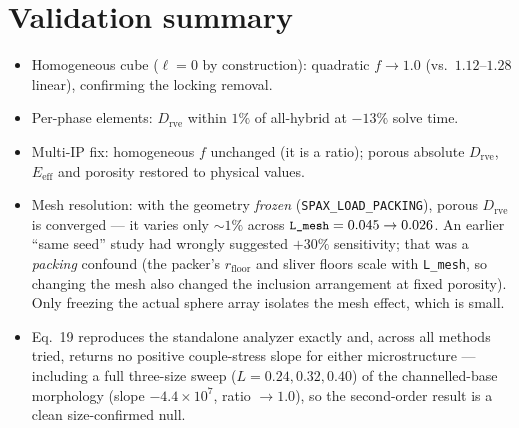 \documentclass[11pt]{article}
\newcommand{\code}[1]{\texttt{\small #1}}
\newcommand{\env}[1]{\texttt{\small #1}}
\begin{document}
\section{Validation summary}
\begin{itemize}[nosep]
  \item Homogeneous cube ($\ell\!=\!0$ by construction): quadratic $f\!\to\!1.0$
        (vs.\ $1.12$--$1.28$ linear), confirming the locking removal.
  \item Per-phase elements: $D_\text{rve}$ within $1\%$ of all-hybrid at
        $-13\%$ solve time.
  \item Multi-IP fix: homogeneous $f$ unchanged (it is a ratio); porous absolute
        $D_\text{rve}$, $E_\text{eff}$ and porosity restored to physical values.
  \item Mesh resolution: with the geometry \emph{frozen}
        (\env{SPAX\_LOAD\_PACKING}), porous $D_\text{rve}$ is converged --- it
        varies only $\sim\!1\%$ across $\code{L\_mesh}=0.045\to0.026$. An earlier
        ``same seed'' study had wrongly suggested $+30\%$ sensitivity; that was a
        \emph{packing} confound (the packer's $r_\text{floor}$ and sliver floors
        scale with \code{L\_mesh}, so changing the mesh also changed the
        inclusion arrangement at fixed porosity). Only freezing the actual sphere
        array isolates the mesh effect, which is small.
  \item Eq.~19 reproduces the standalone analyzer exactly and, across all
        methods tried, returns no positive couple-stress slope for either
        microstructure --- including a full three-size sweep ($L=0.24,0.32,0.40$)
        of the channelled-base morphology (slope $-4.4\times10^{7}$, ratio
        $\to1.0$), so the second-order result is a clean size-confirmed null.
\end{itemize}
\end{document}
